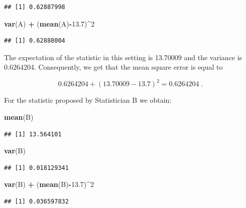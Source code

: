 \documentclass[]{krantz}
\makeatletter
\newenvironment{Shaded}{\begin{snugshade}}{\end{snugshade}}
\newcommand{\KeywordTok}[1]{\textcolor[rgb]{0.13,0.29,0.53}{\textbf{#1}}}
\newcommand{\DecValTok}[1]{\textcolor[rgb]{0.00,0.00,0.81}{#1}}
\newcommand{\FloatTok}[1]{\textcolor[rgb]{0.00,0.00,0.81}{#1}}
\newcommand{\StringTok}[1]{\textcolor[rgb]{0.31,0.60,0.02}{#1}}
\newcommand{\OperatorTok}[1]{\textcolor[rgb]{0.81,0.36,0.00}{\textbf{#1}}}
\newcommand{\NormalTok}[1]{#1}
\newenvironment{kframe}{%
\medskip{}
\setlength{\fboxsep}{.8em}
 \def\at@end@of@kframe{}%
 \ifinner\ifhmode%
  \def\at@end@of@kframe{\end{minipage}}%
  \begin{minipage}{\columnwidth}%
 \fi\fi%
 \def\FrameCommand##1{\hskip\@totalleftmargin \hskip-\fboxsep
 \colorbox{shadecolor}{##1}\hskip-\fboxsep
     \hskip-\linewidth \hskip-\@totalleftmargin \hskip\columnwidth}%
 \MakeFramed {\advance\hsize-\width
   \@totalleftmargin\z@ \linewidth\hsize
   \@setminipage}}%
 {\par\unskip\endMakeFramed%
 \at@end@of@kframe}
\renewenvironment{Shaded}{\begin{kframe}}{\end{kframe}}
\theoremstyle{definition}
\theoremstyle{definition}
\theoremstyle{definition}
\theoremstyle{remark}
\makeatother
\begin{document}
\begin{verbatim}
## [1] 0.62887998
\end{verbatim}

\begin{Shaded}
\begin{Highlighting}[]
\KeywordTok{var}\NormalTok{(A) }\OperatorTok{+}\StringTok{ }\NormalTok{(}\KeywordTok{mean}\NormalTok{(A)}\OperatorTok{-}\FloatTok{13.7}\NormalTok{)}\OperatorTok{^}\DecValTok{2}
\end{Highlighting}
\end{Shaded}

\begin{verbatim}
## [1] 0.62888004
\end{verbatim}

The expectation of the statistic in this setting is 13.70009 and the
variance is 0.6264204. Consequently, we get that the mean square error
is equal to

\[0.6264204 + (13.70009 - 13.7)^2 = 0.6264204\;.\]

For the statistic proposed by Statistician B we obtain:

\begin{Shaded}
\begin{Highlighting}[]
\KeywordTok{mean}\NormalTok{(B)}
\end{Highlighting}
\end{Shaded}

\begin{verbatim}
## [1] 13.564101
\end{verbatim}

\begin{Shaded}
\begin{Highlighting}[]
\KeywordTok{var}\NormalTok{(B)}
\end{Highlighting}
\end{Shaded}

\begin{verbatim}
## [1] 0.018129341
\end{verbatim}

\begin{Shaded}
\begin{Highlighting}[]
\KeywordTok{var}\NormalTok{(B) }\OperatorTok{+}\StringTok{ }\NormalTok{(}\KeywordTok{mean}\NormalTok{(B)}\OperatorTok{-}\FloatTok{13.7}\NormalTok{)}\OperatorTok{^}\DecValTok{2}
\end{Highlighting}
\end{Shaded}

\begin{verbatim}
## [1] 0.036597832
\end{verbatim}
\end{document}
